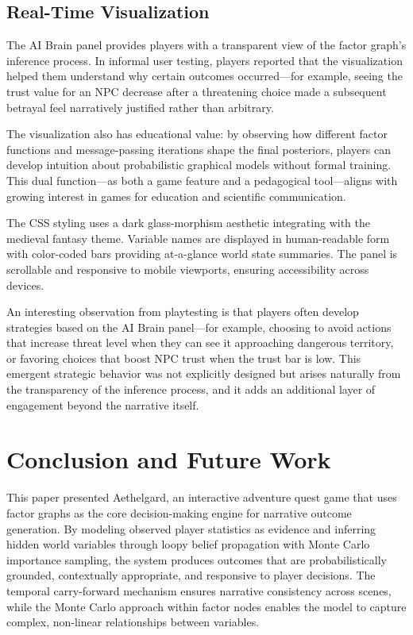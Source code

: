 \documentclass[journal]{IEEEtran}
\begin{document}
\subsection{Real-Time Visualization}

The AI Brain panel provides players with a transparent view of the factor graph's inference process. In informal user testing, players reported that the visualization helped them understand why certain outcomes occurred---for example, seeing the trust value for an NPC decrease after a threatening choice made a subsequent betrayal feel narratively justified rather than arbitrary.

The visualization also has educational value: by observing how different factor functions and message-passing iterations shape the final posteriors, players can develop intuition about probabilistic graphical models without formal training. This dual function---as both a game feature and a pedagogical tool---aligns with growing interest in games for education and scientific communication.

The CSS styling uses a dark glass-morphism aesthetic integrating with the medieval fantasy theme. Variable names are displayed in human-readable form with color-coded bars providing at-a-glance world state summaries. The panel is scrollable and responsive to mobile viewports, ensuring accessibility across devices.

An interesting observation from playtesting is that players often develop strategies based on the AI Brain panel---for example, choosing to avoid actions that increase threat level when they can see it approaching dangerous territory, or favoring choices that boost NPC trust when the trust bar is low. This emergent strategic behavior was not explicitly designed but arises naturally from the transparency of the inference process, and it adds an additional layer of engagement beyond the narrative itself.


\section{Conclusion and Future Work}

This paper presented Aethelgard, an interactive adventure quest game that uses factor graphs as the core decision-making engine for narrative outcome generation. By modeling observed player statistics as evidence and inferring hidden world variables through loopy belief propagation with Monte Carlo importance sampling, the system produces outcomes that are probabilistically grounded, contextually appropriate, and responsive to player decisions. The temporal carry-forward mechanism ensures narrative consistency across scenes, while the Monte Carlo approach within factor nodes enables the model to capture complex, non-linear relationships between variables.
\end{document}
